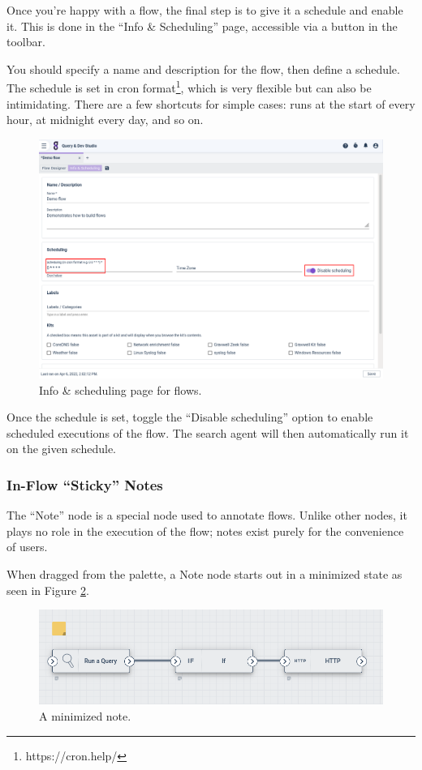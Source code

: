 Once you're happy with a flow, the final step is to give it a schedule and enable it. This is done in the ``Info \& Scheduling'' page, accessible via a button in the toolbar.

You should specify a name and description for the flow, then define a schedule. The schedule is set in cron format\footnote{https://cron.help/}, which is very flexible but can also be intimidating. There are a few shortcuts for simple cases:  runs at the start of every hour,  at midnight every day, and so on.

\begin{figure}
	\includegraphics[width=0.85\linewidth]{images/scheduling.png}
	\caption{Info \& scheduling page for flows.}
	\label{fig:scheduling}
\end{figure}

Once the schedule is set, toggle the ``Disable scheduling'' option to enable scheduled executions of the flow. The search agent will then automatically run it on the given schedule.

\subsubsection{In-Flow ``Sticky'' Notes}

The ``Note'' node is a special node used to annotate flows. Unlike other nodes, it plays no role in the execution of the flow; notes exist purely for the convenience of users.

When dragged from the palette, a Note node starts out in a minimized state as seen in Figure \ref{fig:note-minimized}.

\begin{figure}
	\includegraphics[width=0.6\linewidth]{images/note-minimized.png}
	\caption{A minimized note.}
	\label{fig:note-minimized}
\end{figure}

